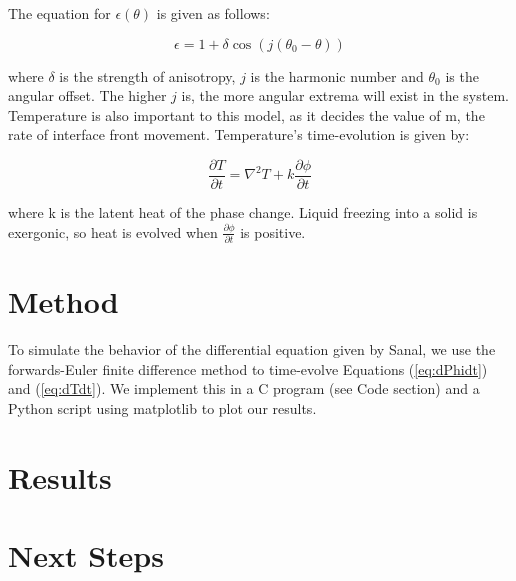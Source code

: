 \documentclass[10pt]{article} %
\begin{document}
The equation for $\epsilon(\theta)$ is given as follows:

\begin{equation}
  \epsilon = 1 + \delta\cos\left(j\left(\theta_0-\theta\right)\right)
\end{equation}

where $\delta$ is the strength of anisotropy, $j$ is the harmonic number and $\theta_0$ is the angular offset. The higher $j$ is, the more angular extrema will exist in the system.\\

Temperature is also important to this model, as it decides the value of m, the rate of interface front movement. Temperature's time-evolution is given by:

\begin{equation}  \label{eq:dTdt}
  \frac{\partial T}{\partial t} = \nabla^2T + k\frac{\partial \phi}{\partial t}
\end{equation}

where k is the latent heat of the phase change. Liquid freezing into a solid is exergonic, so heat is evolved when $\frac{\partial\phi}{\partial t}$ is positive. \\

\section{Method}
To simulate the behavior of the differential equation given by Sanal, we use the forwards-Euler finite difference method to time-evolve Equations (\ref{eq:dPhidt}) and (\ref{eq:dTdt}). We implement this in a C program (see Code section) and a Python script using matplotlib to plot our results.

\section{Results}

\section{Next Steps}
\end{document}
